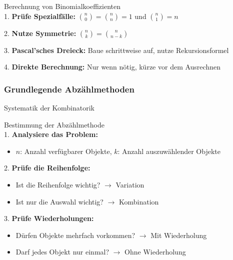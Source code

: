\begin{KR}{Berechnung von Binomialkoeffizienten}\\
1. \textbf{Prüfe Spezialfälle:} $\binom{n}{0} = \binom{n}{n} = 1$ und $\binom{n}{1} = n$

2. \textbf{Nutze Symmetrie:} $\binom{n}{k} = \binom{n}{n-k}$

3. \textbf{Pascal'sches Dreieck:} Baue schrittweise auf, nutze Rekursionsformel

4. \textbf{Direkte Berechnung:} Nur wenn nötig, kürze vor dem Ausrechnen
\end{KR}

\subsubsection{Grundlegende Abzählmethoden}

\begin{concept}{Systematik der Kombinatorik}
\vspace{1mm}\\
\end{concept}

\begin{KR}{Bestimmung der Abzählmethode}\\
1. \textbf{Analysiere das Problem:}
   \begin{itemize}
   \item $n$: Anzahl verfügbarer Objekte, $k$: Anzahl auszuwählender Objekte
   \end{itemize}

2. \textbf{Prüfe die Reihenfolge:}
   \begin{itemize}
   \item Ist die Reihenfolge wichtig? $\rightarrow$ Variation
   \item Ist nur die Auswahl wichtig? $\rightarrow$ Kombination
   \end{itemize}

3. \textbf{Prüfe Wiederholungen:}
   \begin{itemize}
   \item Dürfen Objekte mehrfach vorkommen? $\rightarrow$ Mit Wiederholung
   \item Darf jedes Objekt nur einmal? $\rightarrow$ Ohne Wiederholung
   \end{itemize}
\end{KR}

